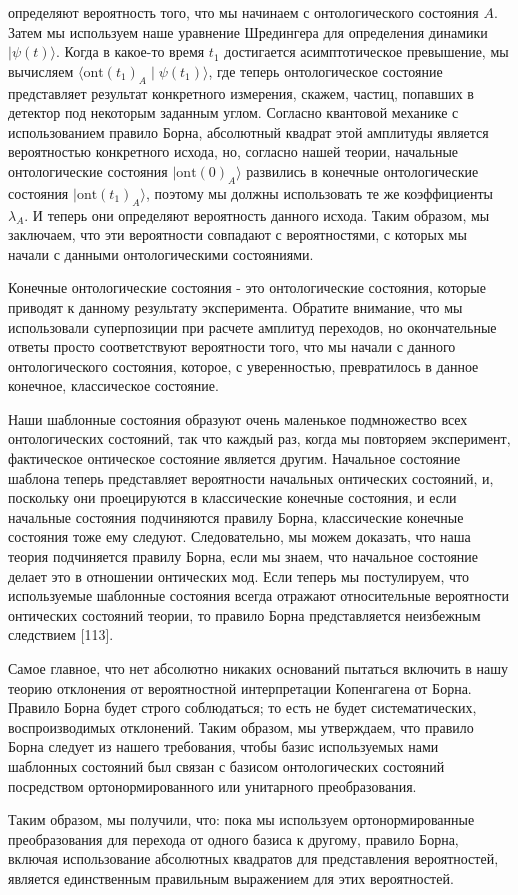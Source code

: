 \documentclass[main.tex]{subfiles}
\begin{document}
определяют вероятность того, что мы начинаем с онтологического состояния $A$. Затем мы используем наше уравнение Шредингера для определения динамики $|\psi(t)\rangle$. Когда в какое-то время $t_1$ достигается асимптотическое превышение, мы вычисляем $\langle \mathrm{ont}(t_1)_A \mid \psi(t_1) \rangle$, где теперь онтологическое состояние представляет результат конкретного измерения, скажем, частиц, попавших в детектор под некоторым заданным углом. Согласно квантовой механике с использованием правило Борна, абсолютный квадрат этой амплитуды является вероятностью конкретного исхода, но, согласно нашей теории, начальные онтологические состояния $|\mathrm{ont}(0)_A\rangle$ развились в конечные онтологические состояния $|\mathrm{ont}(t_1)_A\rangle$, поэтому мы должны использовать те же коэффициенты $\lambda_A$. И теперь они определяют вероятность данного исхода. Таким образом, мы заключаем, что эти вероятности совпадают с вероятностями, с которых мы начали с данными онтологическими состояниями.

Конечные онтологические состояния - это онтологические состояния, которые приводят к данному результату эксперимента. Обратите внимание, что мы использовали суперпозиции при расчете амплитуд переходов, но окончательные ответы просто соответствуют вероятности того, что мы начали с данного онтологического состояния, которое, с уверенностью, превратилось в данное конечное, классическое состояние.

Наши шаблонные состояния образуют очень маленькое подмножество всех онтологических состояний, так что каждый раз, когда мы повторяем эксперимент, фактическое онтическое состояние является другим. Начальное состояние шаблона теперь представляет вероятности начальных онтических состояний, и, поскольку они проецируются в классические конечные состояния, и если начальные состояния подчиняются правилу Борна, классические конечные состояния тоже ему следуют. Следовательно, мы можем доказать, что наша теория подчиняется правилу Борна, если мы знаем, что начальное состояние делает это в отношении онтических мод. Если теперь мы постулируем, что используемые шаблонные состояния всегда отражают относительные вероятности онтических состояний теории, то правило Борна представляется неизбежным следствием [113].

Самое главное, что нет абсолютно никаких оснований пытаться включить в нашу теорию отклонения от вероятностной интерпретации Копенгагена от Борна. Правило Борна будет строго соблюдаться; то есть не будет систематических, воспроизводимых отклонений. Таким образом, мы утверждаем, что правило Борна следует из нашего требования, чтобы базис используемых нами шаблонных состояний был связан с базисом онтологических состояний посредством ортонормированного или унитарного преобразования.

Таким образом, мы получили, что: пока мы используем ортонормированные преобразования для перехода от одного базиса к другому, правило Борна, включая использование абсолютных квадратов для представления вероятностей, является единственным правильным выражением для этих вероятностей.
\end{document}
